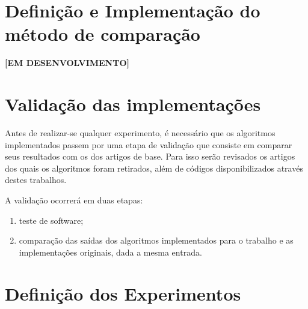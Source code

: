\section{Definição e Implementação do método de comparação}


\textbf{[EM DESENVOLVIMENTO]}





\section{Validação das implementações}

Antes de realizar-se qualquer experimento, é necessário que os algoritmos implementados passem por uma etapa de validação que consiste em comparar seus resultados com os dos artigos de base. Para isso serão revisados os artigos dos quais os algoritmos foram retirados, além de códigos disponibilizados através destes trabalhos.

A validação ocorrerá em duas etapas:

\begin{enumerate}
\item teste de software;
\item comparação das saídas dos algoritmos implementados para o trabalho e as implementações originais, dada a mesma entrada.
\end{enumerate}

\section{Definição dos Experimentos}
\label{sec:definicaoexperimentos}